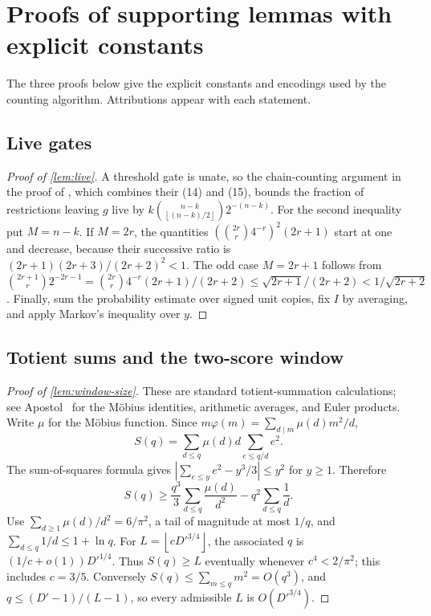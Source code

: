 \documentclass[11pt,letterpaper]{article}
\theoremstyle{definition}
\theoremstyle{remark}
\newcommand{\floor}[1]{\left\lfloor #1\right\rfloor}
\newcommand{\abs}[1]{\left|#1\right|}
\begin{document}
\appendix
\makeatletter
{}
\makeatother
\section{Proofs of supporting lemmas with explicit constants}\label{app:standard}

The three proofs below give the explicit constants and encodings
used by the counting algorithm. Attributions appear with each statement.


\subsection{Live gates}\label{app:live}
\begin{proof}[Proof of \cref{lem:live}]
A threshold gate is unate, so the chain-counting argument in the
proof of \cite[Lemma~A.3.1]{CTW26}, which combines their (14) and (15),
bounds the fraction of restrictions leaving \(g\) live by
\(k\binom{n-k}{\floor{(n-k)/2}}2^{-(n-k)}\). For the second inequality
put \(M=n-k\). If \(M=2r\), the quantities
\((\binom{2r}r4^{-r})^2(2r+1)\) start at one and decrease, because
their successive ratio is \((2r+1)(2r+3)/(2r+2)^2<1\).
The odd case \(M=2r+1\) follows from
\(\binom{2r+1}r2^{-2r-1}=\binom{2r}r4^{-r}(2r+1)/(2r+2)
\le\sqrt{2r+1}/(2r+2)<1/\sqrt{2r+2}\).
Finally, sum the probability estimate over signed unit copies, fix
\(I\) by averaging, and apply Markov's inequality over \(y\).
\end{proof}

\subsection{Totient sums and the two-score window}\label{app:window-size}
\begin{proof}[Proof of \cref{lem:window-size}]
These are standard totient-summation calculations; see
Apostol~\cite[Chapters~2--3 and~11]{Apostol76} for the M\"obius
identities, arithmetic averages, and Euler products.
Write \(\mu\) for the M\"obius function. Since
\(m\varphi(m)=\sum_{d\mid m}\mu(d)m^2/d\),
\[
 S(q)=\sum_{d\le q}\mu(d)d\sum_{e\le q/d}e^2.
\]
The sum-of-squares formula gives
\(\abs{\sum_{e\le y}e^2-y^3/3}\le y^2\) for \(y\ge1\).
Therefore
\[
 S(q)\ge\frac{q^3}{3}\sum_{d\le q}\frac{\mu(d)}{d^2}
          -q^2\sum_{d\le q}\frac1d.
\]
Use \(\sum_{d\ge1}\mu(d)/d^2=6/\pi^2\), a tail of magnitude at most
\(1/q\), and \(\sum_{d\le q}1/d\le1+\ln q\).
For \(L=\floor{cD'^{3/4}}\), the associated \(q\) is
\((1/c+o(1))D'^{1/4}\). Thus \(S(q)\ge L\) eventually whenever
\(c^4<2/\pi^2\); this includes \(c=3/5\).
Conversely \(S(q)\le\sum_{m\le q}m^2=O(q^3)\), and
\(q\le(D'-1)/(L-1)\), so every admissible \(L\) is
\(O(D'^{3/4})\).
\end{proof}
\end{document}
